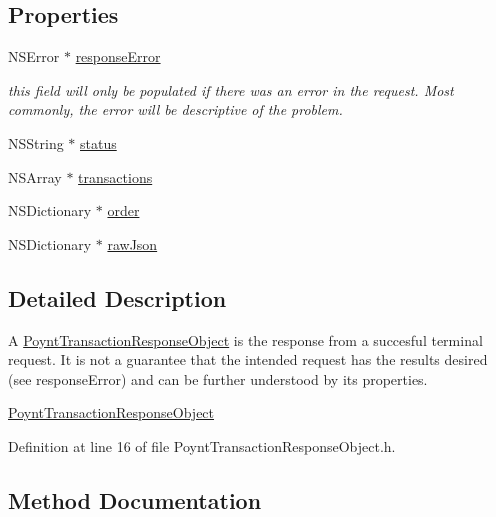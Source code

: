 \subsection*{Properties}
\begin{DoxyCompactItemize}
\item 
N\+S\+Error $\ast$ \hyperlink{interface_poynt_transaction_response_object_aefb1590b30be0658ebee825cad6bfa83}{response\+Error}
\begin{DoxyCompactList}\small\item\em this field will only be populated if there was an error in the request. Most commonly, the error will be descriptive of the problem. \end{DoxyCompactList}\item 
N\+S\+String $\ast$ \hyperlink{interface_poynt_transaction_response_object_ac2acf327011ce6ed9e26a41ceddaee31}{status}
\item 
N\+S\+Array $\ast$ \hyperlink{interface_poynt_transaction_response_object_a12474d50a1838843bcc1cacbbc30c4d2}{transactions}
\item 
N\+S\+Dictionary $\ast$ \hyperlink{interface_poynt_transaction_response_object_a14f67be3c2e0d0a1dfbaf225c2fcef4b}{order}
\item 
N\+S\+Dictionary $\ast$ \hyperlink{interface_poynt_transaction_response_object_a0046f618ca04fd1e7fcf91b87190a944}{raw\+Json}
\end{DoxyCompactItemize}


\subsection{Detailed Description}
A \hyperlink{interface_poynt_transaction_response_object}{Poynt\+Transaction\+Response\+Object} is the response from a succesful terminal request. It is not a guarantee that the intended request has the results desired (see {\ttfamily response\+Error}) and can be further understood by its properties. 

\hyperlink{interface_poynt_transaction_response_object}{Poynt\+Transaction\+Response\+Object} 

Definition at line 16 of file Poynt\+Transaction\+Response\+Object.\+h.



\subsection{Method Documentation}
\hypertarget{interface_poynt_transaction_response_object_a42ee83b8c11bd68e673b38d2a96ca170}{}\label{interface_poynt_transaction_response_object_a42ee83b8c11bd68e673b38d2a96ca170} 
